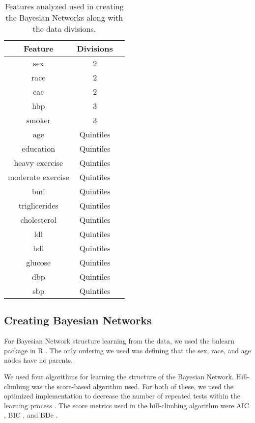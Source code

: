 \begin{table}{}
\centering
\begin{tabular}{ |c|c|c| } 
 \hline
 Feature & Divisions\\ 
 \hline
 sex & 2\\
 \hline
 race & 2\\
 \hline
 cac & 2\\
 \hline
 hbp & 3\\
 \hline
 smoker & 3\\
 \hline
 age & Quintiles\\
 \hline
 education & Quintiles\\
 \hline
 heavy exercise & Quintiles\\
 \hline
 moderate exercise & Quintiles\\
 \hline
 bmi & Quintiles\\
 \hline
 triglicerides & Quintiles\\
 \hline
 cholesterol & Quintiles\\
 \hline
 ldl & Quintiles\\
 \hline
 hdl & Quintiles\\
 \hline
 glucose & Quintiles\\
 \hline
 dbp & Quintiles\\ 
 \hline
 sbp & Quintiles\\ 
 \hline
 
 
 \hline
\end{tabular}
\caption{Features analyzed used in creating the Bayesian Networks along with the data divisions.}
\label{tab:table1}

\end{table}
 
\subsection{Creating Bayesian Networks}

For Bayesian Network structure learning from the data, we used the bnlearn package in R \cite{Scutari2009, scutari2017package}. The only ordering we used was defining that the sex, race, and age nodes have no parents. 

We used four algorithms for learning the structure of the Bayesian Network. Hill-climbing was the score-based algorithm used. For both of these, we used the optimized implementation to decrease the number of repeated tests within the learning process \cite{Daly}. The score metrics used in the hill-climbing algorithm were AIC \cite{Akaike1974}, BIC \cite{Schwarz1978}, and BDe \cite{Heckerman1995}. 
 
